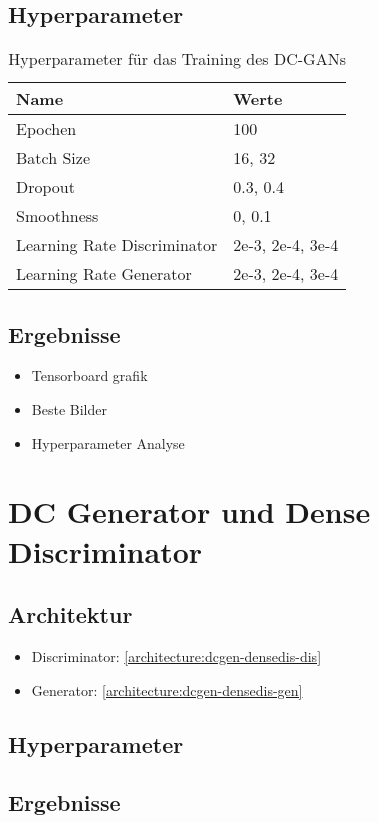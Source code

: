 \subsection{Hyperparameter}
\begin{table}[H]
	\centering
	\begin{tabular}{l l}
		Name                        & Werte            \\ \hline
		Epochen                     & 100              \\
		Batch Size                  & 16, 32           \\
		Dropout                     & 0.3, 0.4         \\
		Smoothness                  & 0, 0.1           \\
		Learning Rate Discriminator & 2e-3, 2e-4, 3e-4 \\
		Learning Rate Generator     & 2e-3, 2e-4, 3e-4
	\end{tabular}
	\caption{Hyperparameter für das Training des DC-GANs}
\end{table}

\subsection{Ergebnisse}
\begin{itemize}
	\item Tensorboard grafik
	\item Beste Bilder
	\item Hyperparameter Analyse
\end{itemize}

\section{DC Generator und Dense Discriminator}

\subsection{Architektur}
\begin{itemize}
	\item Discriminator: \cref{architecture:dcgen-densedis-dis}
	\item Generator: \cref{architecture:dcgen-densedis-gen}
\end{itemize}
\subsection{Hyperparameter}
\subsection{Ergebnisse}
